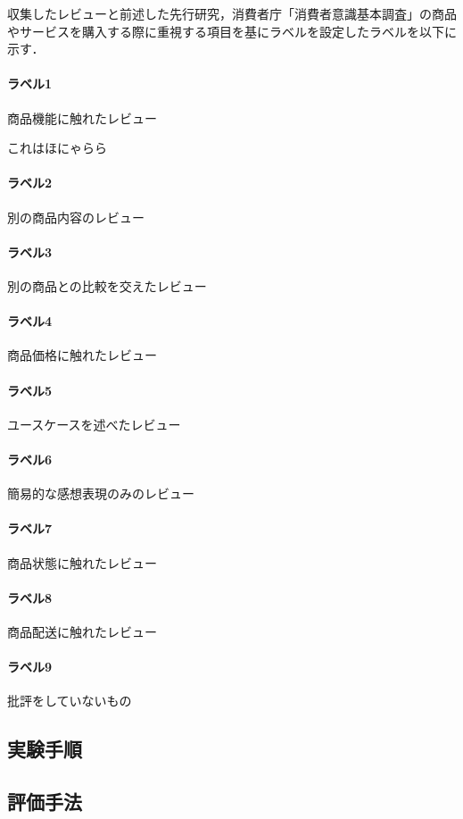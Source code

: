 \documentclass[
  platex, dvipdfmx,  %
]{nlp2024}
\begin{document}
収集したレビューと前述した先行研究，消費者庁「消費者意識基本調査\cite{url1}」の商品やサービスを購入する際に重視する項目を基にラベルを設定したラベルを以下に示す．

\paragraph{ラベル1} 商品機能に触れたレビュー

これはほにゃらら
\paragraph{ラベル2} 別の商品内容のレビュー
\paragraph{ラベル3} 別の商品との比較を交えたレビュー
\paragraph{ラベル4} 商品価格に触れたレビュー
\paragraph{ラベル5} ユースケースを述べたレビュー
\paragraph{ラベル6} 簡易的な感想表現のみのレビュー
\paragraph{ラベル7} 商品状態に触れたレビュー
\paragraph{ラベル8} 商品配送に触れたレビュー
\paragraph{ラベル9} 批評をしていないもの
\subsection{実験手順}
\subsection{評価手法}

\end{document}
